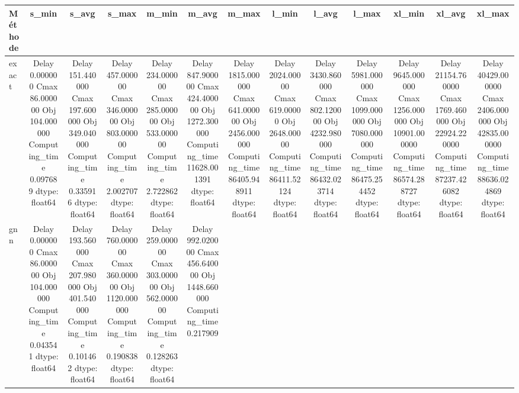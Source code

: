 \begin{tabular}{lcccccccccccc}
\toprule
Méthode & s_min & s_avg & s_max & m_min & m_avg & m_max & l_min & l_avg & l_max & xl_min & xl_avg & xl_max \\
\midrule
exact & Delay               0.000000
Cmax               86.000000
Obj               104.000000
Computing_time      0.097689
dtype: float64 & Delay             151.440000
Cmax              197.600000
Obj               349.040000
Computing_time      0.335916
dtype: float64 & Delay             457.000000
Cmax              346.000000
Obj               803.000000
Computing_time      2.002707
dtype: float64 & Delay             234.000000
Cmax              285.000000
Obj               533.000000
Computing_time      2.722862
dtype: float64 & Delay               847.900000
Cmax                424.400000
Obj                1272.300000
Computing_time    11628.001391
dtype: float64 & Delay              1815.000000
Cmax                641.000000
Obj                2456.000000
Computing_time    86405.948911
dtype: float64 & Delay              2024.00000
Cmax                619.00000
Obj                2648.00000
Computing_time    86411.52124
dtype: float64 & Delay              3430.860000
Cmax                802.120000
Obj                4232.980000
Computing_time    86432.023714
dtype: float64 & Delay              5981.000000
Cmax               1099.000000
Obj                7080.000000
Computing_time    86475.254452
dtype: float64 & Delay              9645.000000
Cmax               1256.000000
Obj               10901.000000
Computing_time    86574.288727
dtype: float64 & Delay             21154.760000
Cmax               1769.460000
Obj               22924.220000
Computing_time    87237.426082
dtype: float64 & Delay             40429.000000
Cmax               2406.000000
Obj               42835.000000
Computing_time    88636.024869
dtype: float64 \\
gnn & Delay               0.000000
Cmax               86.000000
Obj               104.000000
Computing_time      0.043541
dtype: float64 & Delay             193.560000
Cmax              207.980000
Obj               401.540000
Computing_time      0.101462
dtype: float64 & Delay              760.000000
Cmax               360.000000
Obj               1120.000000
Computing_time       0.190838
dtype: float64 & Delay             259.000000
Cmax              303.000000
Obj               562.000000
Computing_time      0.128263
dtype: float64 & Delay              992.020000
Cmax               456.640000
Obj               1448.660000
Computing_time       0.217909

\end{tabular}

